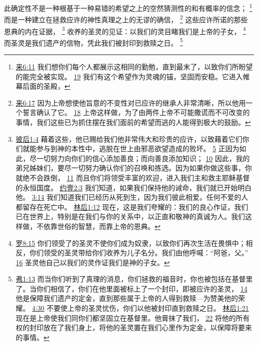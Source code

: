 \documentclass[12pt, a4paper, oneside]{ctexart}
\newcounter{parnum}[section]
\newcommand{\N}{%
   \noindent\refstepcounter{parnum}%
    \makebox[\parindent][l]{\textbf{\arabic{parnum}.}}}
\begin{document}
\N 此确定性不是一种根基于一种易错的希望之上的空然猜测性的和有概率的信念；
	\footnote {
		\href{https://biblehub.com/hebrews/6-11.htm}{来6:11} 我们想你们每个人都展示这相同的勤勉，直到最末了，以致你们所盼望的能完全被实现。
		\href{https://biblehub.com/hebrews/6-19.htm}{19} 我们有这个希望作为灵魂的锚，坚固而安稳。它进入帷幕后面的圣殿，
	}
	而是一种建立在拯救应许的神性真理之上的无谬的确信，
	\footnote {
		\href{https://biblehub.com/hebrews/6-17.htm}{来6:17} 因为上帝想使他旨意的不变性对已应许的继承人非常清晰，所以他用一个誓言确认了它。
		\href{https://biblehub.com/hebrews/6-18.htm}{18} 上帝这样做，为了由两件上帝不可能撒谎而不可改变的事情，我们这些已为抓住摆在我们面前的希望而逃的人能得到极大的鼓励。
	}
	这些应许所诺的那些恩典的内在证据，
	\footnote {
		\href{https://biblehub.com/2_peter/1-4.htm}{彼后1:4} 藉着这些，他已赐给我们他非常伟大和珍贵的应许，以致藉着它们你们就能参与到神的本性中，逃脱在世上由邪恶欲望造成的败坏。
		\href{https://biblehub.com/2_peter/1-5.htm}{5} 正因为如此，尽一切努力向你们的信心添加善良；而向善良添加知识；
		\href{https://biblehub.com/2_peter/1-10.htm}{10} 因此，我的弟兄姊妹们，要尽一切努力确认你们的召唤和拣选。因为如果你做这些事，你就绝不会跌倒，
		\href{https://biblehub.com/2_peter/1-11.htm}{11} 而且你们将领受丰富的欢迎，进入我们主和救主耶稣基督的永恒国度。
		\href{https://biblehub.com/1_john/2-3.htm}{约壹2:3} 我们知道，如果我们保持他的诫命，我们就已开始明白他。
		\href{https://biblehub.com/1_john/3-14.htm}{3:14} 我们知道我们已经历从死到生，因为我们彼此相爱。任何不爱的人都留存在死亡中。
		\href{https://biblehub.com/2_corinthians/1-12.htm}{林后1:12} 现在，这是我们夸耀的：我们的良心作证，我们已在世界上，特别是在我们与你的关系中，以正直和敬神的真诚为人。我们这样做，不依靠世俗的智慧，而靠上帝的恩典。
	}
	收养的圣灵的见证：以我们的灵目睹我们是上帝的子女，
	\footnote {
		\href{https://biblehub.com/romans/8-15.htm}{罗8:15} 你们领受了的圣灵不使你们成为奴隶，以致你们再次生活在畏惧中；相反，你们领受的圣灵带给你们收养为儿子名分。我们由他呼喊：“阿爸，父。”
		\href{https://biblehub.com/romans/8-16.htm}{16} 圣灵他自己以我们的灵作证我们是神的子女。
	}
	而圣灵是我们遗产的信物，凭此我们被封印到救赎之日。
	\footnote {
		\href{https://biblehub.com/ephesians/1-13.htm}{弗1:13} 而当你们听到了真理的消息，你们拯救的福音时，你也被包括在基督里了。当你们相信了，你们在他里面被标上了一个封印，即被应许的圣灵，
		\href{https://biblehub.com/ephesians/1-14.htm}{14} 他是保障我们遗产的定金，直到那些属于上帝的人得到救赎---为赞美他的荣耀。
		\href{https://biblehub.com/ephesians/4-30.htm}{4:30} 不要使上帝的圣灵忧伤，你们以他被封印直到救赎之日。
		\href{https://biblehub.com/2_corinthians/1-21.htm}{林后1:21} 现在是上帝使我们同你们都坚固立在基督里。他膏抹了我们，
		\href{https://biblehub.com/2_corinthians/1-22.htm}{22} 将他的所有权的封印放在了我们身上，将他的圣灵置在我们心里作为定金，以保障将要来的事情。
	}
\end{document}
